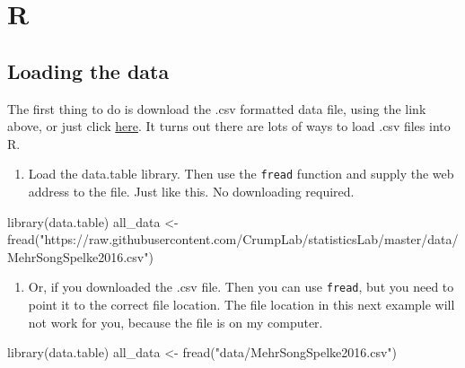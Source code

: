\documentclass[
]{book}
\newenvironment{Shaded}{\begin{snugshade}}{\end{snugshade}}
\newcommand{\FunctionTok}[1]{\textcolor[rgb]{0.00,0.00,0.00}{#1}}
\newcommand{\NormalTok}[1]{#1}
\newcommand{\OtherTok}[1]{\textcolor[rgb]{0.56,0.35,0.01}{#1}}
\newcommand{\StringTok}[1]{\textcolor[rgb]{0.31,0.60,0.02}{#1}}
\providecommand{\tightlist}{%
  \setlength{\itemsep}{0pt}\setlength{\parskip}{0pt}}
\begin{document}
\hypertarget{r-6}{%
\section{R}\label{r-6}}

\hypertarget{loading-the-data}{%
\subsection{Loading the data}\label{loading-the-data}}

The first thing to do is download the .csv formatted data file, using the link above, or just click \href{https://drive.google.com/open?id=0Bz-rhZ21ShvOdW1wV0pmUTJSSk0}{here}. It turns out there are lots of ways to load .csv files into R.

\begin{enumerate}
\def\labelenumi{\arabic{enumi}.}
\tightlist
\item
  Load the data.table library. Then use the \texttt{fread} function and supply the web address to the file. Just like this. No downloading required.
\end{enumerate}

\begin{Shaded}
\begin{Highlighting}[]
\FunctionTok{library}\NormalTok{(data.table)}
\NormalTok{all\_data }\OtherTok{\textless{}{-}} \FunctionTok{fread}\NormalTok{(}\StringTok{"https://raw.githubusercontent.com/CrumpLab/statisticsLab/master/data/MehrSongSpelke2016.csv"}\NormalTok{)}
\end{Highlighting}
\end{Shaded}

\begin{enumerate}
\def\labelenumi{\arabic{enumi}.}
\setcounter{enumi}{1}
\tightlist
\item
  Or, if you downloaded the .csv file. Then you can use \texttt{fread}, but you need to point it to the correct file location. The file location in this next example will not work for you, because the file is on my computer.
\end{enumerate}

\begin{Shaded}
\begin{Highlighting}[]
\FunctionTok{library}\NormalTok{(data.table)}
\NormalTok{all\_data }\OtherTok{\textless{}{-}} \FunctionTok{fread}\NormalTok{(}\StringTok{"data/MehrSongSpelke2016.csv"}\NormalTok{)}
\end{Highlighting}
\end{Shaded}
\end{document}
